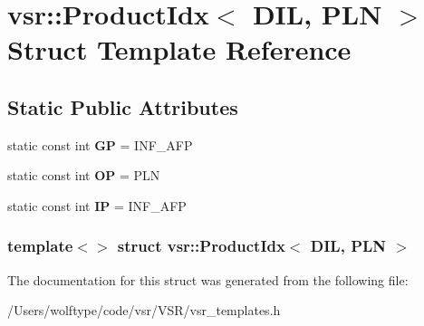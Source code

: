 \hypertarget{structvsr_1_1_product_idx_3_01_d_i_l_00_01_p_l_n_01_4}{\section{vsr\-:\-:Product\-Idx$<$ D\-I\-L, P\-L\-N $>$ Struct Template Reference}
\label{structvsr_1_1_product_idx_3_01_d_i_l_00_01_p_l_n_01_4}
}
\subsection*{Static Public Attributes}
\begin{DoxyCompactItemize}
\item 
\hypertarget{structvsr_1_1_product_idx_3_01_d_i_l_00_01_p_l_n_01_4_a2a282e4ffb8ac2a5c6cb8b5b7fd2acdc}{static const int {\bfseries G\-P} = I\-N\-F\-\_\-\-A\-F\-P}\label{structvsr_1_1_product_idx_3_01_d_i_l_00_01_p_l_n_01_4_a2a282e4ffb8ac2a5c6cb8b5b7fd2acdc}

\item 
\hypertarget{structvsr_1_1_product_idx_3_01_d_i_l_00_01_p_l_n_01_4_afd71c042eadf2fe9aa6c1c83e647bfb2}{static const int {\bfseries O\-P} = P\-L\-N}\label{structvsr_1_1_product_idx_3_01_d_i_l_00_01_p_l_n_01_4_afd71c042eadf2fe9aa6c1c83e647bfb2}

\item 
\hypertarget{structvsr_1_1_product_idx_3_01_d_i_l_00_01_p_l_n_01_4_ad8add159c3f71eb6a0e76dc9ab6726a4}{static const int {\bfseries I\-P} = I\-N\-F\-\_\-\-A\-F\-P}\label{structvsr_1_1_product_idx_3_01_d_i_l_00_01_p_l_n_01_4_ad8add159c3f71eb6a0e76dc9ab6726a4}

\end{DoxyCompactItemize}
\subsubsection*{template$<$$>$ struct vsr\-::\-Product\-Idx$<$ D\-I\-L, P\-L\-N $>$}



The documentation for this struct was generated from the following file\-:\begin{DoxyCompactItemize}
\item 
/\-Users/wolftype/code/vsr/\-V\-S\-R/vsr\-\_\-templates.\-h\end{DoxyCompactItemize}
